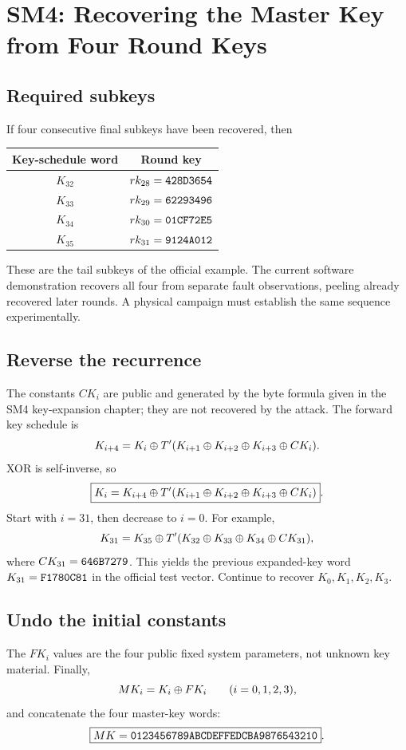 \chapter{SM4: Recovering the Master Key from Four Round Keys}
\section{Required subkeys}
If four consecutive final subkeys have been recovered, then
\begin{center}\begin{tabular}{cc}\toprule Key-schedule word&Round key\\\midrule\(K_{32}\)&\(rk_{28}=\texttt{428D3654}\)\\\(K_{33}\)&\(rk_{29}=\texttt{62293496}\)\\\(K_{34}\)&\(rk_{30}=\texttt{01CF72E5}\)\\\(K_{35}\)&\(rk_{31}=\texttt{9124A012}\)\\\bottomrule\end{tabular}\end{center}
These are the tail subkeys of the official example. The current software demonstration recovers all four from separate fault observations, peeling already recovered later rounds. A physical campaign must establish the same sequence experimentally.
\section{Reverse the recurrence}
The constants \(CK_i\) are public and generated by the byte formula given in the SM4 key-expansion chapter; they are not recovered by the attack. The forward key schedule is
\[K_{i+4}=K_i\mathbin{\oplus} T'(K_{i+1}\mathbin{\oplus} K_{i+2}\mathbin{\oplus} K_{i+3}\mathbin{\oplus} CK_i).\]
XOR is self-inverse, so
\[\boxed{K_i=K_{i+4}\mathbin{\oplus} T'(K_{i+1}\mathbin{\oplus} K_{i+2}\mathbin{\oplus} K_{i+3}\mathbin{\oplus} CK_i)}.\]
Start with \(i=31\), then decrease to \(i=0\). For example,
\[K_{31}=K_{35}\mathbin{\oplus} T'(K_{32}\mathbin{\oplus} K_{33}\mathbin{\oplus} K_{34}\mathbin{\oplus} CK_{31}),\]
where \(CK_{31}=\texttt{646B7279}\). This yields the previous expanded-key word \(K_{31}=\texttt{F1780C81}\) in the official test vector. Continue to recover \(K_0,K_1,K_2,K_3\).
\section{Undo the initial constants}
The \(FK_i\) values are the four public fixed system parameters, not unknown key material. Finally,
\[MK_i=K_i\mathbin{\oplus} FK_i\qquad(i=0,1,2,3),\]
and concatenate the four master-key words:
\[\boxed{MK=\texttt{01234567{}89ABCDEF{}FEDCBA98{}76543210}}.\]
